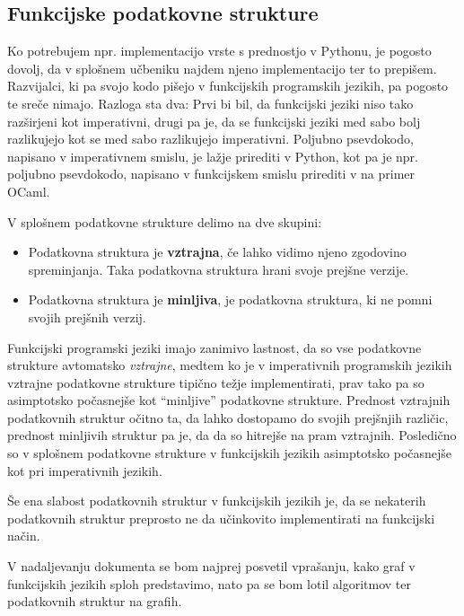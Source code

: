 \documentclass[mat1, tisk]{fmfdelo}
\begin{document}

\subsection{Funkcijske podatkovne strukture}

Ko potrebujem npr. implementacijo vrste s prednostjo v Pythonu, je pogosto dovolj, da v splošnem učbeniku najdem njeno implementacijo ter to prepišem. 
Razvijalci, ki pa svojo kodo pišejo v funkcijskih programskih jezikih, pa pogosto te sreče nimajo. 
Razloga sta dva: Prvi bi bil, da funkcijski jeziki niso tako razširjeni kot imperativni, drugi pa je, da se funkcijski jeziki med sabo bolj razlikujejo kot se med sabo razlikujejo imperativni. 
Poljubno psevdokodo, napisano v imperativnem smislu, je lažje prirediti v Python, kot pa je npr. poljubno psevdokodo, napisano v funkcijskem smislu prirediti v na primer OCaml.

\begin{definicija}
V splošnem podatkovne strukture delimo na dve skupini:
\begin{itemize}
  \item Podatkovna struktura je \textbf{vztrajna}, če lahko vidimo njeno zgodovino spreminjanja. Taka podatkovna struktura hrani svoje prejšne verzije.
  \item Podatkovna struktura je \textbf{minljiva}, je podatkovna struktura, ki ne pomni svojih prejšnih verzij.
\end{itemize}
\end{definicija}

Funkcijski programski jeziki imajo zanimivo lastnost, da so vse podatkovne strukture avtomatsko \textit{vztrajne}, 
medtem ko je v imperativnih programskih jezikih vztrajne podatkovne strukture tipično težje implementirati, prav tako pa so asimptotsko počasnejše kot ``minljive'' podatkovne strukture. 
Prednost vztrajnih podatkovnih struktur očitno ta, da lahko dostopamo do svojih prejšnjih različic, prednost minljivih struktur pa je, da da so hitrejše na pram vztrajnih. 
Posledično so v splošnem podatkovne strukture v funkcijskih jezikih asimptotsko počasnejše kot pri imperativnih jezikih.

Še ena slabost podatkovnih struktur v funkcijskih jezikih je, da se nekaterih podatkovnih struktur preprosto ne da učinkovito implementirati na funkcijski način.

V nadaljevanju dokumenta se bom najprej posvetil vprašanju, kako graf v funkcijskih jezikih sploh predstavimo, nato pa se bom lotil algoritmov ter podatkovnih struktur na grafih.
\end{document}
